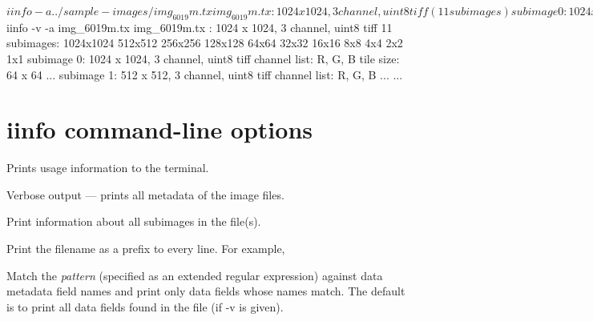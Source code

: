 \begin{code}
    $ iinfo -a ../sample-images/img_6019m.tx

    img_6019m.tx : 1024 x 1024, 3 channel, uint8 tiff (11 subimages)
     subimage  0: 1024 x 1024, 3 channel, uint8 tiff
     subimage  1:  512 x  512, 3 channel, uint8 tiff
     subimage  2:  256 x  256, 3 channel, uint8 tiff
     subimage  3:  128 x  128, 3 channel, uint8 tiff
     subimage  4:   64 x   64, 3 channel, uint8 tiff
     subimage  5:   32 x   32, 3 channel, uint8 tiff
     subimage  6:   16 x   16, 3 channel, uint8 tiff
     subimage  7:    8 x    8, 3 channel, uint8 tiff
     subimage  8:    4 x    4, 3 channel, uint8 tiff
     subimage  9:    2 x    2, 3 channel, uint8 tiff
     subimage 10:    1 x    1, 3 channel, uint8 tiff


    $ iinfo -v -a img_6019m.tx
    img_6019m.tx : 1024 x 1024, 3 channel, uint8 tiff
        11 subimages: 1024x1024 512x512 256x256 128x128 64x64 32x32 16x16 8x8 4x4 2x2 1x1 
     subimage  0: 1024 x 1024, 3 channel, uint8 tiff
        channel list: R, G, B
        tile size: 64 x 64
        ...
     subimage  1:  512 x  512, 3 channel, uint8 tiff
        channel list: R, G, B
        ...
    ...
\end{code}


\section{{\cf iinfo} command-line options}

Prints usage information to the terminal.
\apiend

Verbose output --- prints all metadata of the image files.
\apiend

Print information about all subimages in the file(s).
\apiend

Print the filename as a prefix to every line.  For example,

\apiend

Match the \emph{pattern} (specified as an extended regular expression)
against data metadata field names and print only data fields whose names
match.  The default is to print all data fields found in the file (if
{\cf -v} is given).

